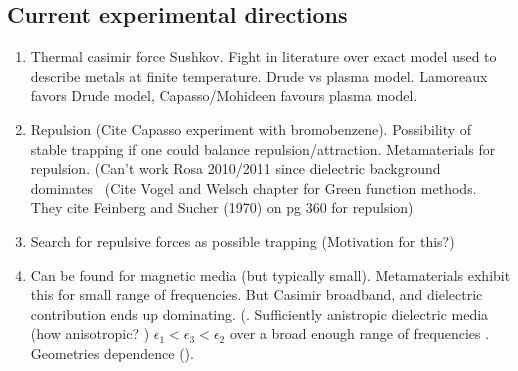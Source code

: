 \subsection{Current experimental directions}
\begin{enumerate}
\item Thermal casimir force
Sushkov\cite{Sushkov2011}.
Fight in literature over exact model used to describe metals at finite temperature.
Drude vs plasma model.  
 Lamoreaux favors Drude model, Capasso/Mohideen favours plasma model.
\item Repulsion (Cite Capasso experiment with bromobenzene).  Possibility of stable trapping
  if one could balance repulsion/attraction.  
 Metamaterials for repulsion.  (Can't work Rosa 2010/2011 since dielectric
  background dominates~\cite{Rosa2008}
  (Cite Vogel and Welsch chapter for Green function methods.  They cite 
  Feinberg and Sucher (1970) on pg 360 for repulsion)
  \item Search for repulsive forces as possible trapping (Motivation for this?)
  \item Can be found for magnetic media (but typically small).
    Metamaterials exhibit this for small range of frequencies.
    But Casimir broadband, and dielectric contribution ends up dominating.
    (.
    Sufficiently anistropic dielectric media (how anisotropic? )
    $\epsilon_1<\epsilon_3<\epsilon_2$ over a broad enough range of frequencies 
    .
    Geometries dependence ().
    


\end{enumerate}

